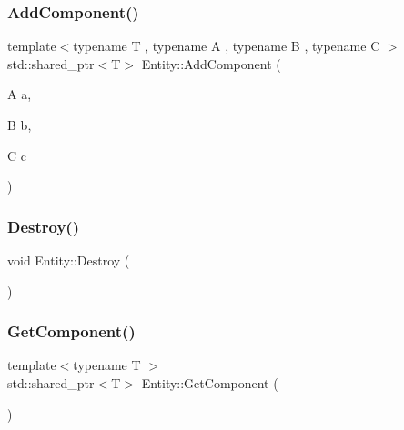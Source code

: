 \mbox{\label{class_entity_abe12552792daa14156ade47eb8db1933}} 
\subsubsection{\texorpdfstring{Add\+Component()}{AddComponent()}\hspace{0.1cm}{\footnotesize\ttfamily [4/4]}}
{\footnotesize\ttfamily template$<$typename T , typename A , typename B , typename C $>$ \\
std\+::shared\+\_\+ptr$<$T$>$ Entity\+::\+Add\+Component (\begin{DoxyParamCaption}\item[{A}]{a,  }\item[{B}]{b,  }\item[{C}]{c }\end{DoxyParamCaption})\hspace{0.3cm}{\ttfamily [inline]}}

\mbox{\label{class_entity_aa75151fc607686b42d27f8c3ba73143d}} 
\subsubsection{\texorpdfstring{Destroy()}{Destroy()}}
{\footnotesize\ttfamily void Entity\+::\+Destroy (\begin{DoxyParamCaption}{ }\end{DoxyParamCaption})}

\mbox{\label{class_entity_ad5cf8774322cc838147e43866a475546}} 
\subsubsection{\texorpdfstring{Get\+Component()}{GetComponent()}}
{\footnotesize\ttfamily template$<$typename T $>$ \\
std\+::shared\+\_\+ptr$<$T$>$ Entity\+::\+Get\+Component (\begin{DoxyParamCaption}{ }\end{DoxyParamCaption})\hspace{0.3cm}{\ttfamily [inline]}}


